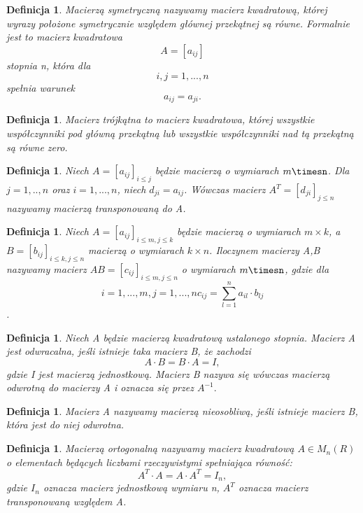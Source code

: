 \documentclass[10pt,a4paper]{report}
\newtheorem{definition}[section]{Definicja}
\begin{document}
\begin{definition}
Macierzą symetryczną nazywamy macierz kwadratową, której wyrazy położone symetrycznie względem głównej przekątnej są równe. Formalnie jest to macierz kwadratowa 
$$A=[a_{ij}]$$ 
stopnia n, która dla 
$$i,j=1,...,n$$ 
spełnia warunek 
$$
a_{ij}=a_{ji}.
$$
\end{definition}

\begin{definition}
Macierz trójkątna to macierz kwadratowa, której wszystkie współczynniki pod główną przekątną lub wszystkie współczynniki nad tą przekątną są równe zero.
\end{definition}

\begin{definition}
Niech $A=[a_{ij}]_{i\le j}$ będzie macierzą o wymiarach $m\timesn$. Dla $j=1,..,n$ oraz $i=1,...,n$, niech $d_{ji}=a_{ij}$. Wówczas macierz $A^{T}=[d_{ji}]_{j\le n}$ nazywamy macierzą transponowaną do A.
\end{definition}

\begin{definition}
Niech $A=[a_{ij}]_{i\le m, j\le k}$ będzie macierzą o wymiarach $m\times k$, a $B=[b_{ij}]_{i\le k, j\le n}$ macierzą o wymiarach $k\times n$. Iloczynem macierzy A,B nazywamy macierz $AB=[c_{ij}]_{i\le m, j\le n}$ o wymiarach $m\timesn$, gdzie dla $$i=1,...,m, j=1,...,n c_{ij}= \sum_{l=1}^{n} a_{il} \cdot b_{lj}$$.
\end{definition}

\begin{definition}
Niech A będzie macierzą kwadratową ustalonego stopnia. Macierz A jest odwracalna, jeśli istnieje taka macierz B, że zachodzi
$$A\cdot B=B\cdot A=I, $$ 
gdzie I jest macierzą jednostkową. Macierz B nazywa się wówczas macierzą odwrotną do macierzy A i oznacza się przez  $A^{-1}.$
\end{definition}

\begin{definition}
Macierz A nazywamy macierzą nieosobliwą, jeśli istnieje macierz B, która jest do niej odwrotna.
\end{definition}  

\begin{definition}
Macierzą ortogonalną nazywamy macierz kwadratową $A\in M_{n}(R)$ o elementach będących liczbami rzeczywistymi spełniająca równość:
$$A^{T}\cdot A=A\cdot A^{T}=I_{n},$$ 
gdzie $I_{n}$ oznacza macierz jednostkową wymiaru n, $A^{T}$ oznacza macierz transponowaną względem A.
\end{definition}
\end{document}
